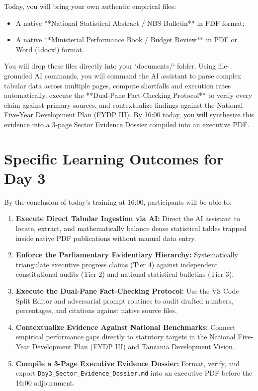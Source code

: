 \documentclass[11pt, a4paper]{report}
\begin{document}
Today, you will bring your own authentic empirical files:
\begin{itemize}[label=-]
    \item A native **National Statistical Abstract / NBS Bulletin** in PDF format;
    \item A native **Ministerial Performance Book / Budget Review** in PDF or Word (`.docx`) format.
\end{itemize}

You will drop these files directly into your `documents/` folder. Using file-grounded AI commands, you will command the AI assistant to parse complex tabular data across multiple pages, compute shortfalls and execution rates automatically, execute the **Dual-Pane Fact-Checking Protocol** to verify every claim against primary sources, and contextualize findings against the National Five-Year Development Plan (FYDP III). By 16:00 today, you will synthesize this evidence into a 3-page Sector Evidence Dossier compiled into an executive PDF.

\section{Specific Learning Outcomes for Day 3}
By the conclusion of today's training at 16:00, participants will be able to:
\begin{enumerate}[label=\textbf{3.\arabic*}]
    \item \textbf{Execute Direct Tabular Ingestion via AI:} Direct the AI assistant to locate, extract, and mathematically balance dense statistical tables trapped inside native PDF publications without manual data entry.
    \item \textbf{Enforce the Parliamentary Evidentiary Hierarchy:} Systematically triangulate executive progress claims (Tier 4) against independent constitutional audits (Tier 2) and national statistical bulletins (Tier 3).
    \item \textbf{Execute the Dual-Pane Fact-Checking Protocol:} Use the VS Code Split Editor and adversarial prompt routines to audit drafted numbers, percentages, and citations against native source files.
    \item \textbf{Contextualize Evidence Against National Benchmarks:} Connect empirical performance gaps directly to statutory targets in the National Five-Year Development Plan (FYDP III) and Tanzania Development Vision.
    \item \textbf{Compile a 3-Page Executive Evidence Dossier:} Format, verify, and export \texttt{Day3\_Sector\_Evidence\_Dossier.md} into an executive PDF before the 16:00 adjournment.
\end{enumerate}
\end{document}
